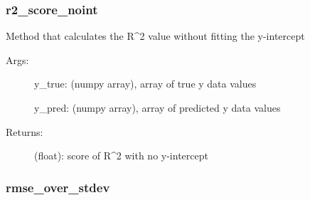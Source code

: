 \documentclass[letterpaper,10pt,english]{sphinxmanual}
\begin{document}
\subsubsection{r2\_score\_noint}
\label{\detokenize{api/mastml.metrics.r2_score_noint:r2-score-noint}}\label{\detokenize{api/mastml.metrics.r2_score_noint::doc}}

\begin{fulllineitems}
\label{\detokenize{api/mastml.metrics.r2_score_noint:mastml.metrics.r2_score_noint}}
Method that calculates the R\textasciicircum{}2 value without fitting the y-intercept
\begin{description}
\item[{Args:}] \leavevmode
y\_true: (numpy array), array of true y data values

y\_pred: (numpy array), array of predicted y data values

\item[{Returns:}] \leavevmode
(float): score of R\textasciicircum{}2 with no y-intercept

\end{description}

\end{fulllineitems}



\subsubsection{rmse\_over\_stdev}
\label{\detokenize{api/mastml.metrics.rmse_over_stdev:rmse-over-stdev}}\label{\detokenize{api/mastml.metrics.rmse_over_stdev::doc}}
\end{document}
